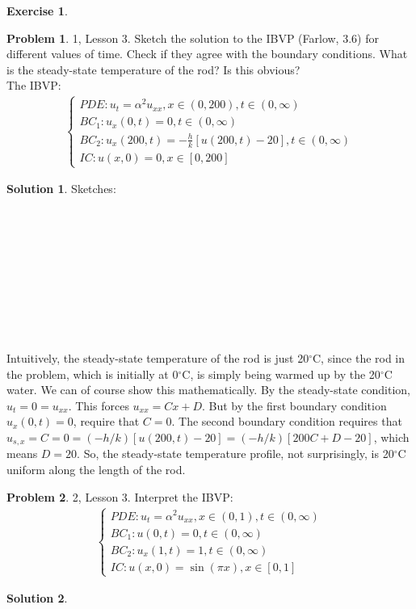 \documentclass{article}
\theoremstyle{definition}
\newtheorem{sln}{Solution}[section]
\newtheorem*{prob*}{Problem}
\newtheorem*{exer*}{Exercise}
\begin{document}
\begin{exer*}
	\begin{prob*}1, Lesson 3. Sketch the solution to the IBVP (Farlow, 3.6) for different values of time. Check if they agree with the boundary conditions. What is the steady-state temperature of the rod? Is this obvious?\\
		
		The IBVP:
		\begin{align*}
		\begin{cases}
		PDE: u_t = \alpha^2 u_{xx}, x\in(0,200), t\in(0,\infty)\\
		BC_1: u_x(0,t) = 0, t\in(0,\infty)\\
		BC_2: u_x(200,t) = -\frac{h}{k}[u(200,t) - 20], t\in(0,\infty)\\
		IC: u(x,0) = 0, x\in[0,200]
		\end{cases}
		\end{align*}
		\begin{sln}
			Sketches:\\\\\\\\\\\\\\\\\\\
			
			Intuitively, the steady-state temperature of the rod is just 20$^\circ$C, since the rod in the problem, which is initially at 0$^\circ$C, is simply being warmed up by the 20$^\circ$C water. We can of course show this mathematically. By the steady-state condition, $u_t = 0 = u_{xx}$. This forces $u_{xx} = Cx + D$. But by the first boundary condition $u_x(0,t)=0$, require that $C = 0$. The second boundary condition requires that $u_{s,x} = C = 0 = (-h/k)[u(200,t) -20] = (-h/k)[200C + D - 20]$, which means $D=20$. So, the steady-state temperature profile, not surprisingly, is 20$^\circ$C uniform along the length of the rod. 
		\end{sln}
	\end{prob*}
	\newpage
	\begin{prob*}2, Lesson 3. Interpret the IBVP:
		\begin{align*}
		\begin{cases}
		PDE: u_t = \alpha^2 u_{xx}, x\in(0,1), t\in(0,\infty)\\
		BC_1: u(0,t) = 0, t\in(0,\infty)\\
		BC_2: u_x(1,t) = 1, t\in(0,\infty)\\
		IC: u(x,0) = \sin(\pi x), x\in[0,1]
		\end{cases}
		\end{align*}
		\begin{sln}
			$\,$\\
			

\end{sln}
\end{prob*}
\end{exer*}
\end{document}
